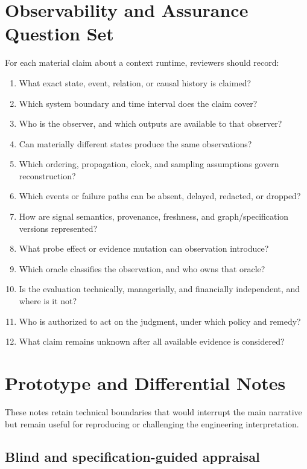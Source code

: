 \documentclass[10pt,a4paper]{article}
\begin{document}
\section{Observability and Assurance Question Set}

For each material claim about a context runtime, reviewers should record:

\begin{enumerate}
  \item What exact state, event, relation, or causal history is claimed?
  \item Which system boundary and time interval does the claim cover?
  \item Who is the observer, and which outputs are available to that observer?
  \item Can materially different states produce the same observations?
  \item Which ordering, propagation, clock, and sampling assumptions govern reconstruction?
  \item Which events or failure paths can be absent, delayed, redacted, or dropped?
  \item How are signal semantics, provenance, freshness, and graph/specification versions represented?
  \item What probe effect or evidence mutation can observation introduce?
  \item Which oracle classifies the observation, and who owns that oracle?
  \item Is the evaluation technically, managerially, and financially independent, and where is it not?
  \item Who is authorized to act on the judgment, under which policy and remedy?
  \item What claim remains unknown after all available evidence is considered?
\end{enumerate}

\section{Prototype and Differential Notes}

These notes retain technical boundaries that would interrupt the main narrative but remain useful for reproducing or challenging the engineering interpretation.

\subsection{Blind and specification-guided appraisal}
\end{document}
